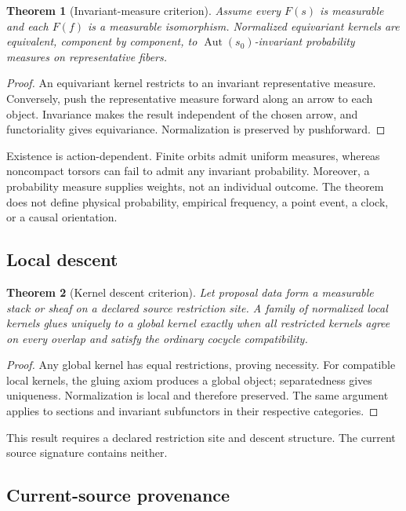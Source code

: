 \documentclass[11pt]{article}
\newtheorem{theorem}{Theorem}
\newcommand{\Aut}{\operatorname{Aut}}
\begin{document}
\begin{theorem}[Invariant-measure criterion]
Assume every $F(s)$ is measurable and each $F(f)$ is a measurable
isomorphism.  Normalized equivariant kernels are equivalent, component by
component, to $\Aut(s_0)$-invariant probability measures on representative
fibers.
\end{theorem}

\begin{proof}
An equivariant kernel restricts to an invariant representative measure.
Conversely, push the representative measure forward along an arrow to each
object.  Invariance makes the result independent of the chosen arrow, and
functoriality gives equivariance.  Normalization is preserved by pushforward.
\end{proof}

Existence is action-dependent.  Finite orbits admit uniform measures, whereas
noncompact torsors can fail to admit any invariant probability.  Moreover, a
probability measure supplies weights, not an individual outcome.  The theorem
does not define physical probability, empirical frequency, a point event, a
clock, or a causal orientation.

\subsection{Local descent}

\begin{theorem}[Kernel descent criterion]
Let proposal data form a measurable stack or sheaf on a declared source
restriction site.  A family of normalized local kernels glues uniquely to a
global kernel exactly when all restricted kernels agree on every overlap and
satisfy the ordinary cocycle compatibility.
\end{theorem}

\begin{proof}
Any global kernel has equal restrictions, proving necessity.  For compatible
local kernels, the gluing axiom produces a global object; separatedness gives
uniqueness.  Normalization is local and therefore preserved.  The same
argument applies to sections and invariant subfunctors in their respective
categories.
\end{proof}

This result requires a declared restriction site and descent structure.  The
current source signature contains neither.

\subsection{Current-source provenance}
\end{document}
